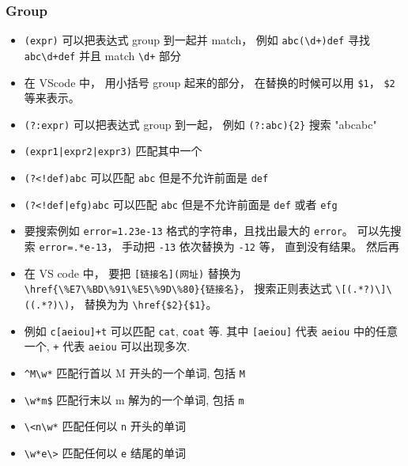 \subsubsection{Group}
\begin{itemize}
\item \verb|(expr)| 可以把表达式 group 到一起并 match， 例如 \verb|abc(\d+)def| 寻找 \verb|abc\d+def| 并且 match \verb|\d+| 部分
\item 在 VScode 中， 用小括号 group 起来的部分， 在替换的时候可以用 \verb|$1|， \verb|$2| 等来表示。
\item \verb|(?:expr)| 可以把表达式 group 到一起， 例如 \verb|(?:abc){2}| 搜索 "abcabc"
\item \verb`(expr1|expr2|expr3)` 匹配其中一个
\item \verb`(?<!def)abc` 可以匹配 \verb|abc| 但是不允许前面是 \verb|def|
\item \verb`(?<!def|efg)abc` 可以匹配 \verb|abc| 但是不允许前面是 \verb|def| 或者 \verb|efg|
\end{itemize}

\begin{example}{}
\begin{itemize}
\item 要搜索例如 \verb|error=1.23e-13| 格式的字符串，且找出最大的 \verb|error|。 可以先搜索 \verb|error=.*e-13|， 手动把 \verb|-13| 依次替换为 \verb|-12| 等， 直到没有结果。 然后再
\item 在 VS code 中， 要把 \verb|[链接名](网址)| 替换为 \verb|\href{\%E7\%BD\%91\%E5\%9D\%80}{链接名}|， 搜索正则表达式 \verb|\[(.*?)\]\((.*?)\)|， 替换为为 \verb|\href{$2}{$1}|。
\item 例如 \verb`c[aeiou]+t` 可以匹配 \verb`cat`, \verb`coat` 等. 其中 \verb`[aeiou]` 代表 \verb`aeiou` 中的任意一个, \verb`+` 代表 \verb`aeiou` 可以出现多次.
\item \verb`^M\w*` 匹配行首以 M 开头的一个单词, 包括 \verb`M`
\item \verb`\w*m$` 匹配行末以 m 解为的一个单词, 包括 \verb`m`
\item \verb`\<n\w*` 匹配任何以 \verb`n` 开头的单词
\item \verb`\w*e\>` 匹配任何以 \verb`e` 结尾的单词
\end{itemize}
\end{example}
